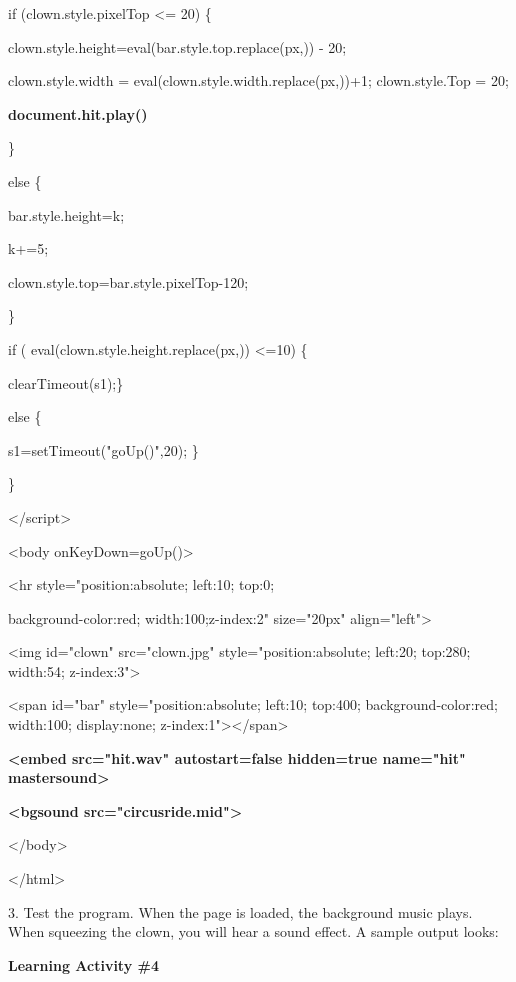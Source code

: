 \documentclass[
]{article}
\begin{document}
if (clown.style.pixelTop \textless= 20) \{

clown.style.height=eval(bar.style.top.replace(\textquotesingle px\textquotesingle,\textquotesingle\textquotesingle))
- 20;

clown.style.width =
eval(clown.style.width.replace(\textquotesingle px\textquotesingle,\textquotesingle\textquotesingle))+1;
clown.style.Top = 20;

\textbf{document.hit.play()}

\}

else \{

bar.style.height=k;

k+=5;

clown.style.top=bar.style.pixelTop-120;

\}

if (
eval(clown.style.height.replace(\textquotesingle px\textquotesingle,\textquotesingle\textquotesingle))
\textless=10) \{

clearTimeout(s1);\}

else \{

s1=setTimeout("goUp()",20); \}

\}

\textless/script\textgreater{}

\textless body onKeyDown=goUp()\textgreater{}

\textless hr style="position:absolute; left:10; top:0;

background-color:red; width:100;z-index:2" size="20px"
align="left"\textgreater{}

\textless img id="clown" src="clown.jpg" style="position:absolute;
left:20; top:280; width:54; z-index:3"\textgreater{}

\textless span id="bar" style="position:absolute; left:10; top:400;
background-color:red; width:100; display:none;
z-index:1"\textgreater\textless/span\textgreater{}

\textbf{\textless embed src="hit.wav" autostart=false hidden=true
name="hit" mastersound\textgreater{}}

\textbf{\textless bgsound src="circusride.mid"\textgreater{}}

\textless/body\textgreater{}

\textless/html\textgreater{}

3. Test the program. When the page is loaded, the background music
plays. When squeezing the clown, you will hear a sound effect. A sample
output looks:

\textbf{Learning Activity \#4}
\end{document}
